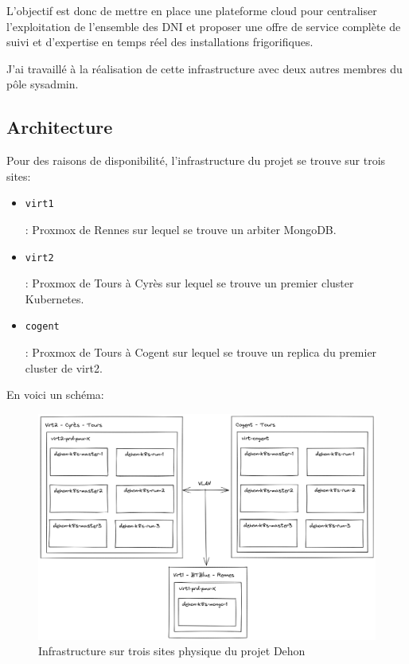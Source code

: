 \documentclass[12pt]{article}
\begin{document}
L'objectif est donc de mettre en place une plateforme cloud pour centraliser l'exploitation de l'ensemble des \gls{DNI} et proposer une offre de service complète de suivi et d'expertise en temps réel des installations frigorifiques.

J'ai travaillé à la réalisation de cette infrastructure avec deux autres membres du pôle sysadmin.

\subsection{Architecture}
Pour des raisons de disponibilité, l'infrastructure du projet se trouve sur trois sites:
\begin{itemize}
    \item \begin{code}\texttt{virt1}\end{code}: \gls{Proxmox} de Rennes sur lequel se trouve un arbiter MongoDB. 
    \item \begin{code}\texttt{virt2}\end{code}: \gls{Proxmox} de Tours à Cyrès sur lequel se trouve un premier \gls{cluster} \gls{Kubernetes}.
    \item \begin{code}\texttt{cogent}\end{code}: \gls{Proxmox} de Tours à Cogent sur lequel se trouve un replica du premier \gls{cluster} de virt2.
\end{itemize}

\newpage
En voici un schéma:
\begin{figure}[!ht]
    \centering
        \includegraphics[width=\textwidth]{src/graph_dehon1.png}
    \caption{Infrastructure sur trois sites physique du projet Dehon}
    \label{fig:graph_dehon1}
\end{figure}
\end{document}

